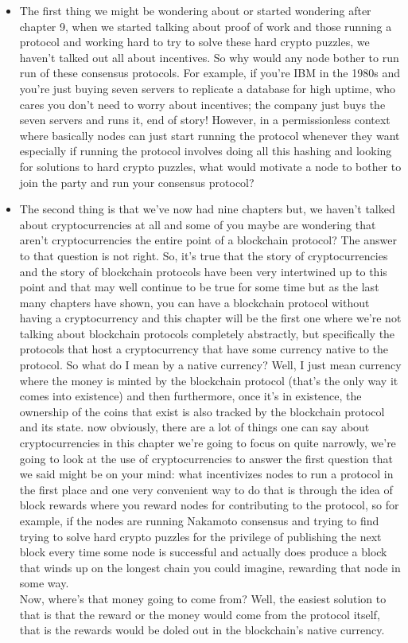 \begin{itemize}
  \item The first thing we might be wondering about or started wondering after chapter 9,
when we started talking about proof of
work and those running a protocol and working hard to try to solve these
hard crypto puzzles, we
haven't talked out all about incentives.
So why would any node bother to run
run of these consensus protocols. For example, if you're IBM in the 1980s and
you're just buying seven servers to replicate a database for high uptime,
who cares you don't need to worry about
incentives; the company just buys
the seven servers and runs it, end of
story! However, in a permissionless context
where basically nodes can just
start running the protocol
whenever they want especially if running
the protocol involves doing all
this hashing and looking for
solutions to hard crypto puzzles, what
would motivate a node to bother
to join the party and run your 
consensus protocol?
  \item The second thing is that
we've now had nine chapters but, we haven't
talked about
cryptocurrencies at all
and some of you maybe are wondering that
aren't cryptocurrencies the entire point
of a blockchain protocol? The answer
to that question is not right. So,
it's true that the story of
cryptocurrencies and the story of
blockchain protocols have been very
intertwined up to this point and that
may well continue to be true for some
time but as the last many
chapters have shown, you can have a
blockchain protocol without having a
cryptocurrency
and this chapter will be the first one
where we're not talking
about blockchain protocols completely
abstractly, but specifically the
protocols that host a cryptocurrency
that have some currency native to the
protocol.
So what do I mean by a native currency?
Well, I just mean currency where
the money is minted by the blockchain
protocol (that's the only way it
comes into existence) and then
furthermore, once it's in existence, the ownership of the coins that exist
is also tracked by the blockchain
protocol and its state.
now obviously, there are a lot of things
one can say about cryptocurrencies in
this chapter we're going to focus on quite
narrowly, we're going to look at the use
of cryptocurrencies to answer the
first question that we said might
be on your mind: what
incentivizes nodes to run a
protocol in the first place and one very
convenient way to do that is through the
idea of block rewards where you
reward nodes for contributing to the
protocol, so for example, if the nodes are
running Nakamoto consensus and
trying to find trying to solve hard
crypto puzzles for the privilege of publishing the next block every time
some node is successful and actually
does produce a block that winds up on
the longest chain you could imagine,
rewarding that node in some way.\\

Now, where's that money going to come from?
Well, the easiest solution
to that is that the reward or the money would come from the
protocol itself, that is the rewards
would be doled out in the blockchain's
native currency.\\
\end{itemize}




